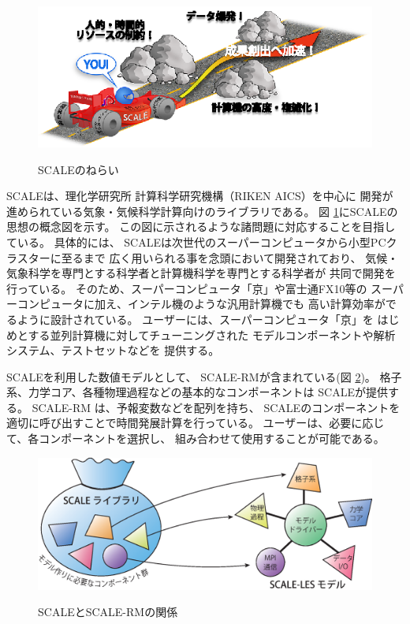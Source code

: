\begin{figure}[htb]
\begin{center}
  \includegraphics[width=0.9\hsize]{./figure/library.eps}\\
  \caption{SCALEのねらい}
  \label{fig:scale}
\end{center}
\end{figure}

SCALEは、理化学研究所 計算科学研究機構（RIKEN AICS）を中心に
開発が進められている気象・気候科学計算向けのライブラリである。
図 \ref{fig:scale}にSCALEの思想の概念図を示す。
この図に示されるような諸問題に対応することを目指している。
具体的には、
SCALEは次世代のスーパーコンピュータから小型PCクラスターに至るまで
広く用いられる事を念頭において開発されており、
気候・気象科学を専門とする科学者と計算機科学を専門とする科学者が
共同で開発を行っている。
そのため、スーパーコンピュータ「京」や富士通FX10等の
スーパーコンピュータに加え、インテル機のような汎用計算機でも
高い計算効率がでるように設計されている。
ユーザーには、スーパーコンピュータ「京」を
はじめとする並列計算機に対してチューニングされた
モデルコンポーネントや解析システム、テストセットなどを
提供する。


SCALEを利用した数値モデルとして、
SCALE-RMが含まれている(図 \ref{fig:scale-rm})。
格子系、力学コア、各種物理過程などの基本的なコンポーネントは
SCALEが提供する。
SCALE-RM は、予報変数などを配列を持ち、
SCALEのコンポーネントを適切に呼び出すことで時間発展計算を行っている。
ユーザーは、必要に応じて、各コンポーネントを選択し、
組み合わせて使用することが可能である。


\begin{figure}[hbt]
\begin{center}
  \includegraphics[width=0.9\hsize]{./figure/scale.eps}\\
  \caption{SCALEとSCALE-RMの関係}
  \label{fig:scale-rm}
\end{center}
\end{figure}


